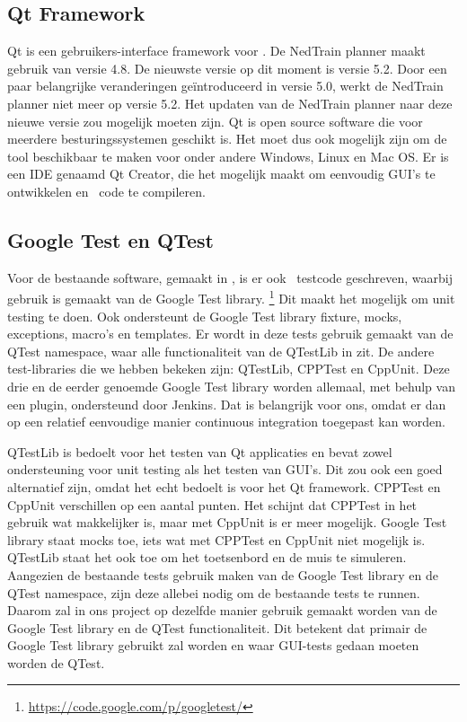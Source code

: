\subsection{Qt Framework}
Qt is een gebruikers-interface framework voor \cpp. De NedTrain planner maakt gebruik van versie 4.8. De nieuwste versie op dit moment is versie 5.2. Door een paar belangrijke veranderingen ge\"introduceerd in versie 5.0, werkt de NedTrain planner niet meer op versie 5.2. Het updaten van de NedTrain planner naar deze nieuwe versie zou mogelijk moeten zijn. Qt is open source software die voor meerdere besturingssystemen geschikt is. Het moet dus ook mogelijk zijn om de tool beschikbaar te maken voor onder andere Windows, Linux en Mac OS. Er is een IDE genaamd Qt Creator, die het mogelijk maakt om eenvoudig GUI's te ontwikkelen en \cpp\ code te compileren.

\subsection{Google Test en QTest}
Voor de bestaande software, gemaakt in \cpp, is er ook \cpp\ testcode geschreven, waarbij gebruik is gemaakt van de Google Test library. \footnote{\url{https://code.google.com/p/googletest/}} Dit maakt het mogelijk om unit testing te doen. Ook ondersteunt de Google Test library fixture, mocks, exceptions, macro's en templates. Er wordt in deze tests gebruik gemaakt van de QTest namespace, waar alle functionaliteit van de QTestLib in zit. De andere test-libraries die we hebben bekeken zijn: QTestLib, CPPTest en CppUnit. Deze drie en de eerder genoemde Google Test library worden allemaal, met behulp van een plugin, ondersteund door Jenkins. Dat is belangrijk voor ons, omdat er dan op een relatief eenvoudige manier continuous integration toegepast kan worden. 

QTestLib is bedoelt voor het testen van Qt applicaties en bevat zowel ondersteuning voor unit testing als het testen van GUI's. Dit zou ook een goed alternatief zijn, omdat het echt bedoelt is voor het Qt framework. CPPTest en CppUnit verschillen op een aantal punten. Het schijnt dat CPPTest in het gebruik wat makkelijker is, maar met CppUnit is er meer mogelijk. Google Test library staat mocks toe, iets wat met CPPTest en CppUnit niet mogelijk is. QTestLib staat het ook toe om het toetsenbord en de muis te simuleren. Aangezien de bestaande tests gebruik maken van de Google Test library en de QTest namespace, zijn deze allebei nodig om de bestaande tests te runnen. Daarom zal in ons project op dezelfde manier gebruik gemaakt worden van de Google Test library en de QTest functionaliteit. Dit betekent dat primair de Google Test library gebruikt zal worden en waar GUI-tests gedaan moeten worden de QTest. 

